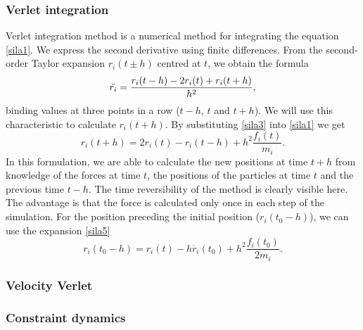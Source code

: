 \subsubsection{Verlet integration}
Verlet integration method is a numerical method for integrating the equation \ref{sila1}. We express the second derivative using finite differences. From the second-order Taylor expansion $r_i(t\pm h)$ centred at $t$, we obtain the formula
\begin{equation}\label{sila3}
	\Ddot{r_i}=\frac{r_i(t-h)-2r_i(t)+r_i(t+h)}{h^2},
\end{equation}
binding values at three points in a row ($t-h$, $t$ and $t+h$). We will use this characteristic to calculate $r_i(t+h)$. By substituting \ref{sila3} into \ref{sila1} we get 
\begin{equation}\label{sila4}
	r_i(t+h)=2r_i(t)-r_i(t-h)+h^2\frac{f_i(t)}{m_i}.
\end{equation}
In this formulation, we are able to calculate the new positions at time $t+h$ from knowledge of the forces at time $t$, the positions of the particles at time $t$ and the previous time $t-h$. The time reversibility of the method is clearly visible here. The advantage is that the force is calculated only once in each step of the simulation. For the position preceding the initial position ($r_i(t_0-h)$), we can use the expansion \ref{sila5}
\begin{equation}\label{sila5}
	r_i(t_0-h)=r_i(t)-h\dot{r_i}(t_0)+h^2\frac{f_i(t_0)}{2m_i}.
\end{equation}

\subsubsection{Velocity Verlet}

\subsubsection{Constraint dynamics}

